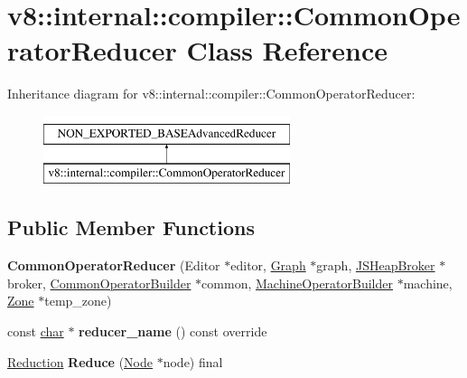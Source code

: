 \hypertarget{classv8_1_1internal_1_1compiler_1_1CommonOperatorReducer}{}\section{v8\+:\+:internal\+:\+:compiler\+:\+:Common\+Operator\+Reducer Class Reference}
\label{classv8_1_1internal_1_1compiler_1_1CommonOperatorReducer}
Inheritance diagram for v8\+:\+:internal\+:\+:compiler\+:\+:Common\+Operator\+Reducer\+:\begin{figure}[H]
\begin{center}
\leavevmode
\includegraphics[height=2.000000cm]{classv8_1_1internal_1_1compiler_1_1CommonOperatorReducer}
\end{center}
\end{figure}
\subsection*{Public Member Functions}
\begin{DoxyCompactItemize}
\item 
\mbox{\label{classv8_1_1internal_1_1compiler_1_1CommonOperatorReducer_ad9bbd1e91aba5715c43b0436eafb21b8}} 
{\bfseries Common\+Operator\+Reducer} (Editor $\ast$editor, \mbox{\hyperlink{classv8_1_1internal_1_1compiler_1_1Graph}{Graph}} $\ast$graph, \mbox{\hyperlink{classv8_1_1internal_1_1compiler_1_1JSHeapBroker}{J\+S\+Heap\+Broker}} $\ast$broker, \mbox{\hyperlink{classv8_1_1internal_1_1compiler_1_1CommonOperatorBuilder}{Common\+Operator\+Builder}} $\ast$common, \mbox{\hyperlink{classv8_1_1internal_1_1compiler_1_1MachineOperatorBuilder}{Machine\+Operator\+Builder}} $\ast$machine, \mbox{\hyperlink{classv8_1_1internal_1_1Zone}{Zone}} $\ast$temp\+\_\+zone)
\item 
\mbox{\label{classv8_1_1internal_1_1compiler_1_1CommonOperatorReducer_a28e5182a9d5e91eb21c3986cb734dcd9}} 
const \mbox{\hyperlink{classchar}{char}} $\ast$ {\bfseries reducer\+\_\+name} () const override
\item 
\mbox{\label{classv8_1_1internal_1_1compiler_1_1CommonOperatorReducer_ac6eeb8559d70bb7886bea714a65f911d}} 
\mbox{\hyperlink{classv8_1_1internal_1_1compiler_1_1Reduction}{Reduction}} {\bfseries Reduce} (\mbox{\hyperlink{classv8_1_1internal_1_1compiler_1_1Node}{Node}} $\ast$node) final
\end{DoxyCompactItemize}


